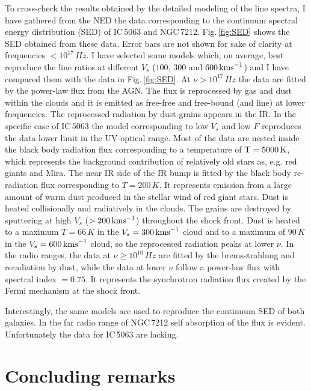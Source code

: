 \documentclass[../main.tex]{subfiles}
\begin{document}
To cross-check the results obtained by the detailed modeling of the line spectra, I have gathered from the NED the data corresponding to the continuum spectral energy distribution (SED) of IC\,5063 and NGC\,7212. 
Fig.\,\ref{fig:SED} shows the SED obtained from these data. 
Error bars are not shown for sake of clarity at frequencies $< 10^{17}\,\si{Hz}$.
I have selected some models which, on average, best reproduce the line ratios at different   $V_s$ ($100$, $300$ and $600 \,\si{\kms}$) and I have compared them with the data in Fig.\,\ref{fig:SED}.
At $\nu>10^{17}\,\si{Hz}$ the data are fitted by the power-law flux from the AGN.
The flux is reprocessed by gas and dust within the clouds and it is emitted as free-free and free-bound (and line) at lower frequencies. 
The reprocessed radiation by dust grains appears in the IR.
In the specific case of IC\,5063 the model corresponding to low $V_s$ and low $F$ reproduces the data lower limit in the UV-optical range.
Most of the data are nested inside the black body radiation flux corresponding to a temperature of $\rm T=5000\,\si{K}$, which represents the background contribution of relatively old stars as, e.g. red giants and Mira. 
The near IR side of the IR bump is fitted by the black body re-radiation flux corresponding to $ T=200\,\si{K}$. 
It represents emission from a large amount of warm dust produced in the stellar wind of red giant stars. 
Dust is heated collisionally and radiatively in the clouds.
The grains are destroyed by sputtering at high   $V_s$ ($> 200 \,\si{\kms}$) throughout the shock front.
Dust is heated to a maximum $T=66\,\si{K}$ in the $V_s =300 \,\si{\kms}$ cloud and to a maximum of $90\,\si{K}$ in the $V_s=600 \,\si{\kms}$ cloud, so the reprocessed radiation peaks at lower $\nu$. 
In the radio ranges, the data at $\nu\geq 10^{10}\,\si{Hz}$ are fitted by the bremsstrahlung and reradiation by dust, while the data at lower $\nu$ follow a power-law flux with spectral index $=0.75$. 
It represents the synchrotron radiation flux created by the Fermi mechanism at the shock front.

Interestingly, the same models are used to reproduce the continuum SED of  both galaxies.
In the far radio range of NGC\,7212 self absorption of the flux is evident. 
Unfortunately the data for IC\,5063 are lacking.


\section{Concluding remarks}
\label{sec:conclusions}
\end{document}
